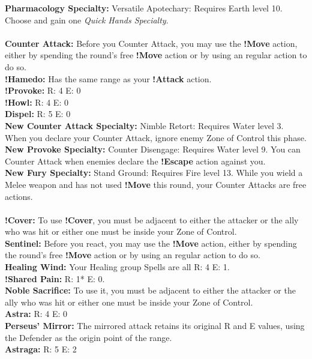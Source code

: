 \textbf{Pharmacology Specialty:} Versatile Apotechary: Requires Earth level 10. Choose and gain one \textit{Quick Hands Specialty}.
%
\\\\
%
 \ofrow
\textbf{Counter Attack:} Before you Counter Attack, you may use the \textbf{!Move} action, either by spending the round’s free \textbf{!Move} action or by using an regular action to do so.\\
\textbf{!Hamedo:} Has the same range as your \textbf{!Attack} action.\\
\textbf{!Provoke:} R: 4 E: 0\\
\textbf{!Howl:} R: 4 E: 0\\
\textbf{Dispel:} R: 5 E: 0\\
\textbf{New Counter Attack Specialty:} Nimble Retort: Requires Water level 3. When you declare your Counter Attack, ignore enemy Zone of Control this phase.\\
\textbf{New Provoke Specialty:} Counter Disengage: Requires Water level 9. You can Counter Attack when enemies declare the \textbf{!Escape} action against you.\\
\textbf{New Fury Specialty:} Stand Ground: Requires Fire level 13. While you wield a Melee weapon and has not used \textbf{!Move} this round, your Counter Attacks are free actions.
%
\\\\
%
 \ofrow
\textbf{!Cover:} To use \textbf{!Cover}, you must be adjacent to either the attacker or the ally who was hit or either one must be inside your Zone of Control.\\
\textbf{Sentinel:} Before you react, you may use the \textbf{!Move} action, either by spending the round’s free \textbf{!Move} action or by using an regular action to do so.\\
\textbf{Healing Wind:} Your Healing group Spells are all R: 4 E: 1.\\
\textbf{!Shared Pain:} R: 1* E: 0.\\
\textbf{Noble Sacrifice:} To use it, you must be adjacent to either the attacker or the ally who was hit or either one must be inside your Zone of Control.\\
\textbf{Astra:} R: 4 E: 0\\
\textbf{Perseus’ Mirror:} The mirrored attack retains its original R and E values, using the Defender as the origin point of the range.\\
\textbf{Astraga:} R: 5 E: 2\\
